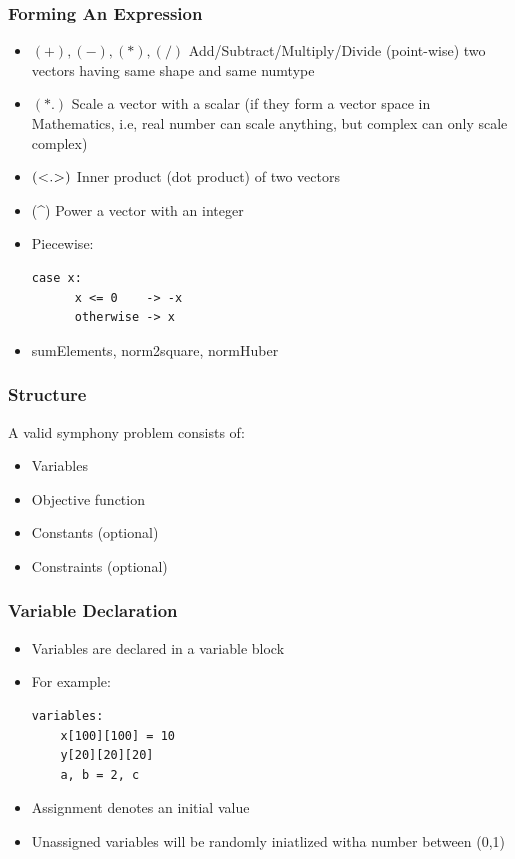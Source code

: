\documentclass[presentation]{beamer}
\begin{document}
\begin{frame}[fragile]
  \frametitle{Forming An Expression}

  \begin{itemize}
    \item $(+),(-),(*),(/)$ Add/Subtract/Multiply/Divide (point-wise) two vectors having same shape and same numtype
    \item $(*.)$ Scale a vector with a scalar (if they form a vector space in Mathematics, i.e, real number can scale anything, 
    but complex can only scale complex)
    \item $(\textsc{<.>})$ Inner product (dot product) of two vectors 
    \item (\^{}) Power a vector with an integer
    \item Piecewise:
    \begin{lstlisting}[style=Haskell]
    case x:
      x <= 0    -> -x
      otherwise -> x
    \end{lstlisting} 
    \item sumElements, norm2square, normHuber
  \end{itemize}
\end{frame}


\begin{frame}[fragile]
  \frametitle{Structure}
  A valid symphony problem consists of:
  \begin{itemize}
  \item Variables 
  \item Objective function 
  \item Constants (optional)
  \item Constraints (optional)
  \end{itemize}
\end{frame}

\begin{frame}[fragile]
  \frametitle{Variable Declaration}

  \begin{itemize}
  \item Variables are declared in a {\color{red} variable} block
  \item For example:
  \begin{lstlisting}[style=Haskell]
  variables:
    x[100][100] = 10
    y[20][20][20]
    a, b = 2, c
  \end{lstlisting}
  \item Assignment denotes an initial value
  \item Unassigned variables will be randomly iniatlized witha number between (0,1)
  \end{itemize}
\end{frame}
\end{document}
